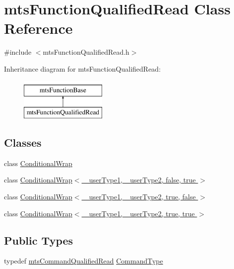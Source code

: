 \hypertarget{classmts_function_qualified_read}{}\section{mts\+Function\+Qualified\+Read Class Reference}
\label{classmts_function_qualified_read}


{\ttfamily \#include $<$mts\+Function\+Qualified\+Read.\+h$>$}

Inheritance diagram for mts\+Function\+Qualified\+Read\+:\begin{figure}[H]
\begin{center}
\leavevmode
\includegraphics[height=2.000000cm]{d5/d9f/classmts_function_qualified_read}
\end{center}
\end{figure}
\subsection*{Classes}
\begin{DoxyCompactItemize}
\item 
class \hyperlink{classmts_function_qualified_read_1_1_conditional_wrap}{Conditional\+Wrap}
\item 
class \hyperlink{classmts_function_qualified_read_1_1_conditional_wrap_3_01__user_type1_00_01__user_type2_00_01false_00_01true_01_4}{Conditional\+Wrap$<$ \+\_\+user\+Type1, \+\_\+user\+Type2, false, true $>$}
\item 
class \hyperlink{classmts_function_qualified_read_1_1_conditional_wrap_3_01__user_type1_00_01__user_type2_00_01true_00_01false_01_4}{Conditional\+Wrap$<$ \+\_\+user\+Type1, \+\_\+user\+Type2, true, false $>$}
\item 
class \hyperlink{classmts_function_qualified_read_1_1_conditional_wrap_3_01__user_type1_00_01__user_type2_00_01true_00_01true_01_4}{Conditional\+Wrap$<$ \+\_\+user\+Type1, \+\_\+user\+Type2, true, true $>$}
\end{DoxyCompactItemize}
\subsection*{Public Types}
\begin{DoxyCompactItemize}
\item 
typedef \hyperlink{classmts_command_qualified_read}{mts\+Command\+Qualified\+Read} \hyperlink{classmts_function_qualified_read_ae78bcee54ee0392f510d2f33600c316f}{Command\+Type}
\end{DoxyCompactItemize}
